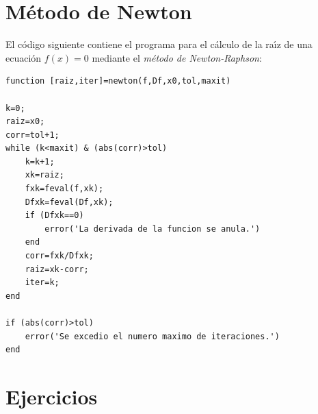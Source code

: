 \documentclass[11pt]{article}
\begin{document}
\section{\bf M\'etodo de Newton}
El c\'odigo siguiente contiene el programa para el 
c\'alculo de la ra\'{\i}z de una ecuaci\'on $f(x)=0$ mediante el 
{\em m\'etodo de Newton-Raphson}:

\begin{lstlisting}
function [raiz,iter]=newton(f,Df,x0,tol,maxit)

k=0;
raiz=x0;
corr=tol+1;
while (k<maxit) & (abs(corr)>tol)
    k=k+1;
    xk=raiz;
    fxk=feval(f,xk);
    Dfxk=feval(Df,xk);
    if (Dfxk==0)
        error('La derivada de la funcion se anula.')
    end
    corr=fxk/Dfxk;
    raiz=xk-corr;
    iter=k;
end

if (abs(corr)>tol)
    error('Se excedio el numero maximo de iteraciones.')
end
\end{lstlisting}


\section{Ejercicios}
\end{document}
